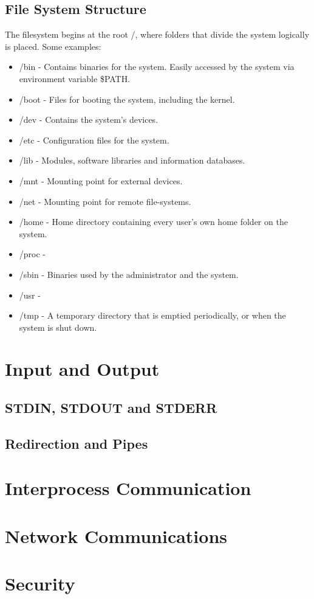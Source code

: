 \documentclass[12pt]{article}
\begin{document}
\subsection{File System Structure}
  The filesystem begins at the root /, where folders that divide the system logically is placed. Some examples:
  \begin{itemize}
    \item /bin - Contains binaries for the system. Easily accessed by the system via environment variable \$PATH.
    \item /boot - Files for booting the system, including the kernel.
    \item /dev - Contains the system's devices.
    \item /etc - Configuration files for the system.
    \item /lib - Modules, software libraries and information databases.
    \item /mnt - Mounting point for external devices.
    \item /net - Mounting point for remote file-systems.
    \item /home - Home directory containing every user's own home folder on the system. 
    \item /proc - 
    \item /sbin - Binaries used by the administrator and the system.
    \item /usr -
    \item /tmp - A temporary directory that is emptied periodically, or when the system is shut down.
  \end{itemize}
 
\section{Input and Output} %
\subsection{STDIN, STDOUT and STDERR}
\subsection{Redirection and Pipes}

\section{Interprocess Communication} %

\section{Network Communications} %

\section{Security} %
\end{document}
